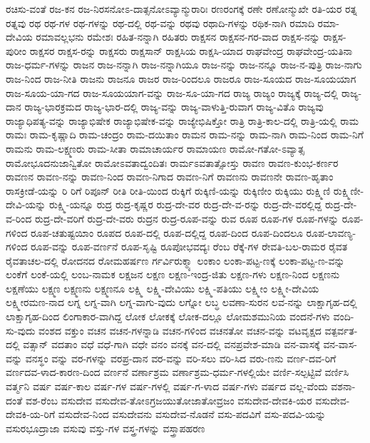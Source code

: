 {ರಚಿಸು-ವಂತೆ
ರಜ-ಕನ
ರಜ-ನಿರಸನೋಽ-ದಾತ್ಸನೋಽವ್ಯಾನ್ಮುರಾರಿಃ
ರಣರಂಗಕ್ಕೆ
ರಣೇ
ರಣೋನ್ಮುಖೇ
ರತಿ-ಯರ
ರತ್ನ
ರತ್ನವು
ರಥ
ರಥ-ಗಳ
ರಥ-ಗಳನ್ನು
ರಥ-ದಲ್ಲಿ
ರಥ-ವನ್ನು
ರಥವು
ರಥಾದಿ-ಗಳನ್ನು
ರಥಿಕ-ನಾಗಿ
ರಮಾದಿ
ರಮಾ-ದೇವಿಯ
ರಮಾವಲ್ಲಭನು
ರಮೇಶಃ
ರಹಿತ-ನನ್ನಾಗಿ
ರಹಿತರು
ರಾಕ್ಷಸನ
ರಾಕ್ಷಸನ-ಗರ-ವಾದ
ರಾಕ್ಷಸ-ನನ್ನು
ರಾಕ್ಷಸ-ಪುರೀಂ
ರಾಕ್ಷಸರ
ರಾಕ್ಷಸ-ರನ್ನು
ರಾಕ್ಷಸರು
ರಾಕ್ಷಸಾನ್
ರಾಕ್ಷಸಿಯ
ರಾಕ್ಷಸಿ-ಯಾದ
ರಾಘವೇಂದ್ರ
ರಾಘವೇಂದ್ರ-ಯತಿನಾ
ರಾಜ-ಧರ್ಮ-ಗಳನ್ನು
ರಾಜನ
ರಾಜ-ನನ್ನಾಗಿ
ರಾಜ-ನನ್ನಾಗಿಯೂ
ರಾಜ-ನನ್ನು
ರಾಜ-ನನ್ನೂ
ರಾಜ-ನ-ಪುತ್ರಿ
ರಾಜ-ನಾಗು
ರಾಜ-ನಿಂದ
ರಾಜ-ನೀತಿ
ರಾಜನು
ರಾಜನೂ
ರಾಜರ
ರಾಜ-ರಿಂದಲೂ
ರಾಜರೂ
ರಾಜ-ಸೂಯದ
ರಾಜ-ಸೂಯಯಾಗ
ರಾಜ-ಸೂಯ-ಯಾ-ಗದ
ರಾಜ-ಸೂಯಯಾಗ-ವನ್ನು
ರಾಜ-ಸೂ-ಯಾ-ಗದ
ರಾಜ್ಯ
ರಾಜ್ಯಂ
ರಾಜ್ಯಕ್ಕೆ
ರಾಜ್ಯ-ದಲ್ಲಿ
ರಾಜ್ಯ-ದಾನ
ರಾಜ್ಯ-ಭಾರಕ್ರಮದ
ರಾಜ್ಯ-ಭಾರ-ದಲ್ಲಿ
ರಾಜ್ಯ-ವನ್ನು
ರಾಜ್ಯ-ವಾಳುತ್ತಿ-ರುವಾಗ
ರಾಜ್ಯ-ವಿತೊ
ರಾಜ್ಯವು
ರಾಜ್ಯಾಧಿಪತ್ಯ-ವನ್ನು
ರಾಜ್ಯಾಭಿಷೇಕ
ರಾಜ್ಯಾಭಿಷೇಕ-ವನ್ನು
ರಾಜ್ಯೇಭಿಷಿಕ್ತೋ
ರಾತ್ರಿ
ರಾತ್ರಿ-ಕಾಲ-ದಲ್ಲಿ
ರಾತ್ರಿ-ಯಲ್ಲಿ
ರಾಮ
ರಾಮಃ
ರಾಮ-ಕೃಷ್ಣಾದಿ
ರಾಮ-ಚಂದ್ರಂ
ರಾಮ-ದಯಿತಾಂ
ರಾಮನ
ರಾಮ-ನನ್ನು
ರಾಮ-ನಾಗಿ
ರಾಮ-ನಿಂದ
ರಾಮ-ನಿಗೆ
ರಾಮನು
ರಾಮ-ಲಕ್ಷ್ಮಣರು
ರಾಮ-ಸೀತಾ
ರಾಮಾಚಾರ್ಯರ
ರಾಮಾಯಣ
ರಾಮೋ-ಗತೋ-ಽವ್ಯಾತ್ಸ
ರಾಮೋಭೂದನುಜಾನ್ವಿತೋ
ರಾಮೋಽವತಾದ್ವಂದಿತಃ
ರಾರ್ಮಽವತಾತ್ಸೋಸ್ತು
ರಾವಣ
ರಾವಣ-ಕುಂಭ-ಕರ್ಣರ
ರಾವಣನ
ರಾವಣ-ನನ್ನು
ರಾವಣ-ನಿಂದ
ರಾವಣ-ನಿಗಾದ
ರಾವಣ-ನಿಗೆ
ರಾವಣನು
ರಾವಣನೇ
ರಾವಣ-ಹೃತಾಂ
ರಾಸಕ್ರೀಡೆ-ಯನ್ನು
ರಿ
ರಿಗೆ
ರಿಪೂನ್
ರೀತಿ
ರೀತಿ-ಯಿಂದ
ರುಕ್ಕಿಗೆ
ರುಕ್ಕಿಣಿ-ಯನ್ನು
ರುಕ್ಕಿಣೀಂ
ರುಕ್ಕಿಯು
ರುಕ್ಷ್ಮಿಣಿ
ರುಕ್ಷ್ಮಿಣೀ-ದೇವಿ-ಯನ್ನು
ರುಕ್ಷ್ಮಿ-ಯನ್ನೂ
ರುದ್ರ
ರುದ್ರ-ಕೃಷ್ಣರ
ರುದ್ರ-ದೇ-ವರ
ರುದ್ರ-ದೇ-ವ-ರನ್ನು
ರುದ್ರ-ದೇ-ವರಲ್ಲಿದ್ದ
ರುದ್ರ-ದೇ-ವ-ರಿಂದ
ರುದ್ರ-ದೇ-ವರಿಗೆ
ರುದ್ರ-ದೇ-ವರು
ರುದ್ರನ
ರುದ್ರ-ರೂಪ-ವನ್ನು
ರುವ
ರೂಪ
ರೂಪ-ಗಳ
ರೂಪ-ಗಳನ್ನು
ರೂಪ-ಗಳಿಂದ
ರೂಪ-ಚತುಷ್ಟಯಿಾಂ
ರೂಪದ
ರೂಪ-ದಲ್ಲಿ
ರೂಪ-ದಲ್ಲಿದ್ದ
ರೂಪ-ದಿಂದ
ರೂಪ-ದಿಂದಲೂ
ರೂಪ-ಲಾವಣ್ಯ-ಗಳಿಂದ
ರೂಪ-ವನ್ನು
ರೂಪ-ವರ್ಣನೆ
ರೂಪ-ಸೃಷ್ಟಿ
ರೂಪೋಭವದ್ಯಃ
ರೆಂಬ
ರೆಕ್ಕೆ-ಗಳ
ರೇವತಿ-ಬಲ-ರಾಮರ
ರೈವತ
ರೈವತಾಚಲ-ದಲ್ಲಿ
ರೋದನದ
ರೋಮಹರ್ಷಣ
ರ್ಗರ್ವಿರುಕ್ಮ್ಯಾ
ಲಂಕಾಂ
ಲಂಕಾ-ಪಟ್ಟ-ಣಕ್ಕೆ
ಲಂಕಾ-ಪಟ್ಟ-ಣ-ವನ್ನು
ಲಂಕೆಗೆ
ಲಂಕೆ-ಯಲ್ಲಿ
ಲಂಬ-ನಾಮಕ
ಲಕ್ಷಜನ
ಲಕ್ಷಣ
ಲಕ್ಷಣ-ಇಂದ್ರ-ಜಿತು
ಲಕ್ಷಣ-ಗಳು
ಲಕ್ಷಣ-ನಿಂದ
ಲಕ್ಷಣನು
ಲಕ್ಷಣೆಯು
ಲಕ್ಷ್ಮಣ
ಲಕ್ಷ್ಮಣನು
ಲಕ್ಷ್ಮಣನೂ
ಲಕ್ಷ್ಮಿ
ಲಕ್ಷ್ಮಿ-ದೇವಿಯು
ಲಕ್ಷ್ಮಿ-ಪತಿಯು
ಲಕ್ಷ್ಮೀಂ
ಲಕ್ಷ್ಮೀ-ದೇವಿಯ
ಲಕ್ಷ್ಮೀರಮಣ-ನಾದ
ಲಗ್ನ
ಲಗ್ನ-ವಾಗಿ
ಲಗ್ನ-ವಾಗು-ವುದು
ಲಗ್ನೋ
ಲಬ್ಧ
ಲವಣಾ-ಸುರನ
ಲವ-ನನ್ನು
ಲಾಕ್ಷಾಗೃಹ-ದಲ್ಲಿ
ಲಾಕ್ಷಾಗೃಹ-ದಿಂದ
ಲಿಂಗಾಕಾರ-ವಾಗಿದ್ದ
ಲೋಕ
ಲೋಕಕ್ಕೆ
ಲೋಕ-ದಲ್ಲೂ
ಲೋಮಶಮುನಿಯ
ವಂದನೆ-ಗಳು
ವಂದಿ-ಸು-ವುದು
ವಂಶದ
ವಕ್ತುಂ
ವಚನ
ವಚನ-ಗಳನ್ನಾಡಿ
ವಚನ-ಗಳಿಂದ
ವಚನತೋ
ವಚನ-ವನ್ನು
ವಟವೃಕ್ಷದ
ವತ್ಪರ್ವತ-ದಲ್ಲಿ
ವತ್ಸಾನ್
ವದತಾಂ
ವಧೆ
ವಧೆ-ಗಾಗಿ
ವಧೇ
ವನಂ
ವನಕ್ಕೆ
ವನ-ದಲ್ಲಿ
ವನಪ್ರವೇಶ-ಮಾಡಿ
ವನ-ವಾಸಕ್ಕೆ
ವನ-ವಾಸ-ವನ್ನು
ವನಸ್ಥಂ
ವನ್ನು
ವರ-ಗಳನ್ನು
ವರಪ್ರ-ದಾನ
ವರ-ವನ್ನು
ವರಿ-ಸಲು
ವರಿ-ಸಿದ
ವರು-ಣನು
ವರ್ಣ-ದವ-ರಿಗೆ
ವರ್ಣದವ-ಳಾದ-ಕಾರಣ-ದಿಂದ
ವರ್ಣನೆ
ವರ್ಣಾಶ್ರಮ
ವರ್ಣಾಶ್ರಮ-ಧರ್ಮ-ಗಳಲ್ಲಿಯೇ
ವರ್ಣಿ-ಸಲ್ಪಟ್ಟಿವೆ
ವರ್ಣಿಸಿ
ವರ್ತ್ಮನಿ
ವರ್ಷ
ವರ್ಷ-ಕಾಲ
ವರ್ಷ-ಗಳ
ವರ್ಷ-ಗಳಲ್ಲಿ
ವರ್ಷ-ಗ-ಳಾದ
ವರ್ಷ-ಗಳು
ವರ್ಷದ
ವಲ್ಲ-ವೆಂದು
ವಶನಾ-ದಂತೆ
ವಶ-ರೆಂಬ
ವಸುದೇವ
ವಸುದೇವ-ತೋಽಗ್ರಜಯುತೋಜಾತೋವ್ರಜಂ
ವಸುದೇವ-ದೇವಕಿ-ಯರ
ವಸುದೇವ-ದೇವಕಿ-ಯ-ರಿಗೆ
ವಸುದೇವ-ನಿಂದ
ವಸುದೇವನು
ವಸುದೇವ-ನೊಡನೆ
ವಸು-ಪದವಿಗೆ
ವಸು-ಪದವಿ-ಯನ್ನು
ವಸುರಭೂದ್ರಾಜಾ
ವಸುವು
ವಸ್ತು-ಗಳ
ವಸ್ತ್ರ-ಗಳನ್ನು
ವಸ್ತ್ರಾಪಹರಣ
}
